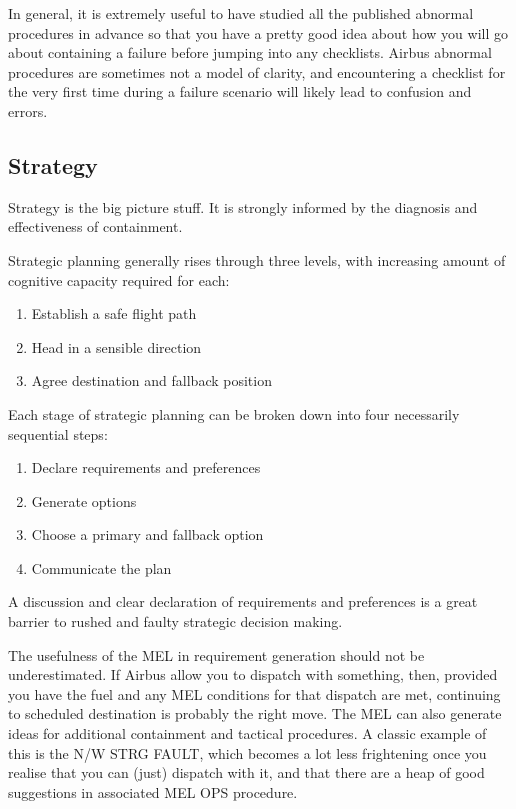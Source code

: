 \documentclass[a5paper,11pt,titlepage]{article}
\begin{document}
In general, it is extremely useful to have studied all the published
abnormal procedures in advance so that you have a pretty good idea about
how you will go about containing a failure before jumping into any
checklists. Airbus abnormal procedures are sometimes not a model of
clarity, and encountering a checklist for the very first time during a
failure scenario will likely lead to confusion and errors.

\subsection{Strategy}

Strategy is the big picture stuff. It is strongly informed by the
diagnosis and effectiveness of containment.

Strategic planning generally rises through three levels, with increasing
amount of cognitive capacity required for each:

\begin{enumerate}
\item Establish a safe flight path
\item Head in a sensible direction
\item Agree destination and fallback position
\end{enumerate}

Each stage of strategic planning can be broken down into four
necessarily sequential steps:

\begin{enumerate}
\item Declare requirements and preferences
\item Generate options
\item Choose a primary and fallback option
\item Communicate the plan
\end{enumerate}

A discussion and clear declaration of requirements and preferences is a
great barrier to rushed and faulty strategic decision making.

The usefulness of the MEL in requirement generation should not be
underestimated. If Airbus allow you to dispatch with something, then,
provided you have the fuel and any MEL conditions for that dispatch are
met, continuing to scheduled destination is probably the right move. The
MEL can also generate ideas for additional containment and tactical
procedures. A classic example of this is the N/W STRG FAULT, which
becomes a lot less frightening once you realise that you can (just)
dispatch with it, and that there are a heap of good suggestions in
associated MEL OPS procedure.
\end{document}
